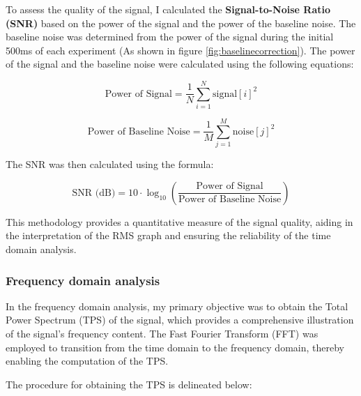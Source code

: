\documentclass[conference]{IEEEtran}
\begin{document}
To assess the quality of the signal, I calculated the \textbf{Signal-to-Noise Ratio (SNR)} based on the power of the signal and the power of the baseline noise. 
The baseline noise was determined from the power of the signal during the initial 500ms of each experiment (As shown in figure \ref{fig:baselinecorrection}). 
The power of the signal and the baseline noise were calculated using the following equations:

\[
\text{Power of Signal} = \frac{1}{N} \sum_{i=1}^{N} \text{signal}[i]^2
\]

\[
\text{Power of Baseline Noise} = \frac{1}{M} \sum_{j=1}^{M} \text{noise}[j]^2
\]

The SNR was then calculated using the formula:

\[
\text{SNR (dB)} = 10 \cdot \log_{10}\left(\frac{\text{Power of Signal}}{\text{Power of Baseline Noise}}\right)
\]

This methodology provides a quantitative measure of the signal quality, aiding in the interpretation of the RMS graph and ensuring the reliability of the time domain 
analysis.

\subsubsection{Frequency domain analysis}
In the frequency domain analysis, my primary objective was to obtain the Total Power 
Spectrum (TPS) of the signal, which provides a comprehensive illustration of the signal's 
frequency content. The Fast Fourier Transform (FFT) was employed to transition from the time 
domain to the frequency domain, thereby enabling the computation of the TPS.

The procedure for obtaining the TPS is delineated below:
\end{document}
